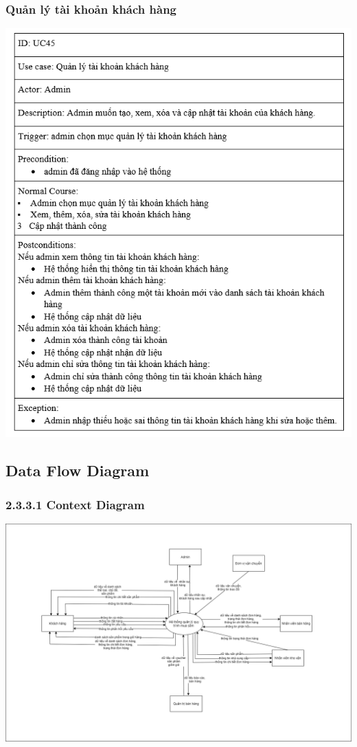 \documentclass[12pt,a4paper,2sides]{report}
\begin{document}
\subsubsection{Quản lý tài khoản khách hàng}
    \includegraphics[width=1\linewidth]{lib/usecase/quanlytkkh.png}\\\vspace*{1cm} 
\subsection{Data Flow Diagram}
\subsubsection{2.3.3.1 Context Diagram}
    \includegraphics[width=1\linewidth]{lib/DFD/contextdi.png}\\\vspace*{1cm} 
    \hspace{5cm}{Hình 2. Context diagram}\\
\end{document}
